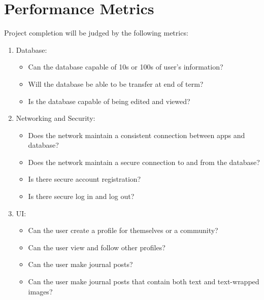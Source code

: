 \documentclass[letterpaper,10pt,titlepage]{article}
\begin{document}
\section*{Performance Metrics}\par
\hspace{4ex}Project completion will be judged by the following metrics:
\begin{enumerate}
\item Database:
\begin{itemize}
\item Can the database capable of 10s or 100s of user's information?
\item Will the database be able to be transfer at end of term?
\item Is the database capable of being edited and viewed?
\end{itemize}
\item Networking and Security:
\begin{itemize}
\item Does the network maintain a consistent connection between apps and database?
\item Does the network maintain a secure connection to and from the database?
\item Is there secure account registration?
\item Is there secure log in and log out?
\end{itemize}

\item UI:
\begin{itemize}
\item Can the user create a profile for themselves or a community?
\item Can the user view and follow other profiles?
\item Can the user make journal posts?
\item Can the user make journal posts that contain both text and text-wrapped images?
\end{itemize} 
\end{enumerate}
\end{document}
